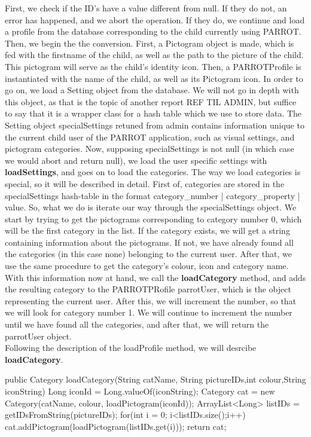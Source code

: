 First, we check if the ID's have a value different from null. If they do not, an error has happened, and we abort the operation.
If they do, we continue and load a profile from the database corresponding to the child currently using PARROT.
Then, we begin the the conversion.
First, a Pictogram object is made, which is fed with the firstname of the child, as well as the path to the picture of the child.
This pictogram will serve as the child's identity icon.
Then, a PARROTProfile is instantiated with the name of the child, as well as its Pictogram icon.
In order to go on, we load a Setting object from the database. We will not go in depth with this object, as that is the topic of another report REF TIL ADMIN, but suffice to say that it is a wrapper class for a hash table %
which we use to store data.
The Setting object specialSettings retuned from admin contains information unique to the current child user of the PARROT application, such as visual settings, and pictogram categories.
Now, supposing specialSettings is not null (in which case we would abort and return null), we load the user specific settings with \textbf{loadSettings}, and goes on to load the categories.
The way we load categories is special, so it will be described in detail.
First of, categories are stored in the specialSettings hash-table in the format category\_number | category\_property | value.
So, what we do is iterate our way through the specialSettings object.
We start by trying to get the pictograms corresponding to category number 0, which will be the first category in the list.
If the category exists, we will get a string containing information about the pictograms.
If not, we have already found all the categories (in this case none) belonging to the current user.
After that, we use the same procedure to get the category's colour, icon and category name.
With this information now at hand, we call the \textbf{loadCategory} method, and adds the resulting category to the PARROTPRofile parrotUser, which is the object representing the current user.
After this, we will increment the number, so that we will look for category number 1.
We will continue to increment the number until we have found all the categories, and after that, we will return the parrotUser object.\newline
\\
Following the description of the loadProfile method, we will desrcibe \textbf{loadCategory}.

\begin{source}{}
	public Category loadCategory(String catName, String pictureIDs,int colour,String iconString)
	{
		Long iconId = Long.valueOf(iconString);
		Category cat = new Category(catName, colour, loadPictogram(iconId));
		ArrayList<Long> listIDs = getIDsFromString(pictureIDs);
		for(int i = 0; i<listIDs.size();i++)
		{
			cat.addPictogram(loadPictogram(listIDs.get(i)));
		}
		return cat;
	}
\end{source}

